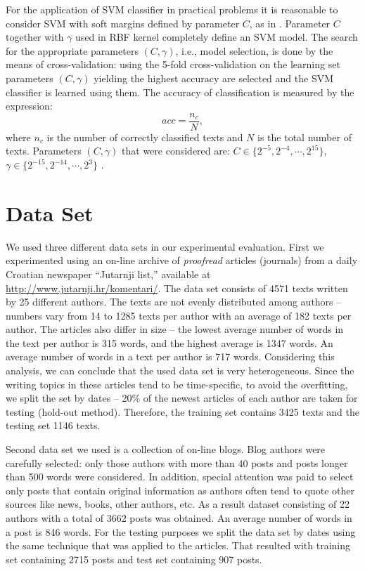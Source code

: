 \documentclass{llncs}
\begin{document}
For the application of SVM classifier in practical problems it is reasonable to
consider SVM with soft margins defined by parameter $C$, as in
\cite{cortes1995support}. Parameter $C$ together with $\gamma$ used in RBF kernel
completely define an SVM model. The search for the appropriate parameters $(C,
\gamma)$, i.e., model selection, is done by the means of cross-validation: using
the 5-fold cross-validation on the learning set parameters $(C, \gamma)$ yielding
the highest accuracy are selected and the SVM classifier is learned using them.
The accuracy of classification is measured by the expression:
\begin{equation}
acc = \frac{n_c}{N}, %
\end{equation}
where $n_c$ is the number of correctly classified texts and $N$ is the total number of
texts.
Parameters $(C, \gamma)$ that were considered are: $C \in \{2^{-5}, 2^{-4},
\cdots , 2^{15}\}$, $\gamma \in \{2^{-15}, 2^{-14}, \cdots, 2^3\}$ \cite{CC01a}.

\section{Data Set}
\label{sec:podatci}
We used three different data sets in our experimental evaluation. First we
experimented using an on-line archive of \emph{proofread} articles (journals)
from a daily Croatian newspaper ``Jutarnji list,'' available at
\url{http://www.jutarnji.hr/komentari/}. The data set consists of 4571 texts
written by 25 different authors. The texts are not evenly distributed among
authors -- numbers vary from 14 to 1285 texts per author with an average of 182
texts per author. The articles also differ in size -- the lowest average number
of words in the text per author is 315 words, and the highest average is 1347
words. An average number of words in a text per author is 717 words. Considering
this analysis, we can conclude that the used data set is very heterogeneous.
Since the writing topics in these articles tend to be time-specific, to avoid the
overfitting, we split the set by dates -- 20\% of the newest articles of each
author are taken for testing (hold-out method). Therefore, the training set
contains 3425 texts and the testing set 1146 texts.

Second data set we used is a collection of on-line blogs. Blog authors were
carefully selected: only those authors with more than 40 posts
and posts longer than 500 words were considered. In addition, special attention
was paid to select only posts that contain original information as authors often tend to
quote other sources like news, books, other authors, etc. As a result dataset
consisting of 22 authors with a total of 3662 posts was obtained. An
average number of words in a post is 846 words. For the testing purposes we
split the data set by dates using the same technique that was applied to the
articles. That resulted with training set containing 2715 posts and test set
containing 907 posts.
\end{document}
